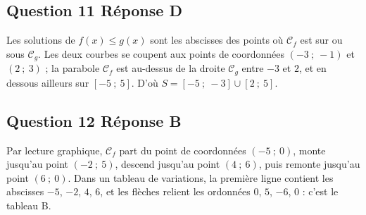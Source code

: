 \documentclass[10pt]{article}
\begin{document}
\subsection*{Question 11 \quad Réponse D}

Les solutions de $f(x) \leqslant g(x)$ sont les abscisses des points où $\mathcal{C}_f$ est
sur ou sous $\mathcal{C}_g$. Les deux courbes se coupent aux points de coordonnées
$(-3~;~-1)$ et $(2~;~3)$ ; la parabole $\mathcal{C}_f$ est au-dessus de la droite
$\mathcal{C}_g$ entre $-3$ et $2$, et en dessous ailleurs sur $[-5~;~5]$. D'où
$S = [-5~;~-3] \cup [2~;~5]$.

\subsection*{Question 12 \quad Réponse B}

Par lecture graphique, $\mathcal{C}_f$ part du point de coordonnées $(-5~;~0)$, monte jusqu'au point $(-2~;~5)$, descend jusqu'au point $(4~;~6)$, puis remonte jusqu'au point $(6~;~0)$. Dans un tableau de variations, la première ligne contient les abscisses $-5$, $-2$, $4$, $6$,
et les flèches relient les ordonnées $0$, $5$, $-6$, $0$ : c'est le tableau B.
\end{document}
